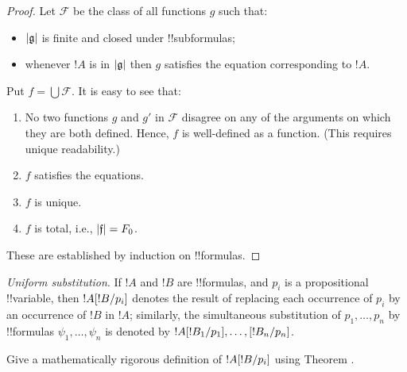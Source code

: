 \documentclass[../../include/open-logic-section]{subfiles}
\begin{document}
\begin{proof}
  Let $\mathcal{F}$ be the class of all functions $g$ such that:
  \begin{itemize}
  \item $\left| \mathfrak g \right|$ is finite and closed under !!{subformula}s;
  \item whenever $!A$ is in $\left| \mathfrak g \right|$ then $g$ satisfies the
    equation corresponding to $!A$.
  \end{itemize}
  Put $f = \bigcup \mathcal{F}$. It is easy to see that: 
  \begin{enumerate}
  \item No two functions $g$ and $g'$ in $\mathcal{F}$ disagree on any
    of the arguments on which they are both defined. Hence, $f$ is
    well-defined as a function. (This requires unique readability.)
  \item $f$ satisfies the equations.
  \item $f$ is unique.
  \item $f$ is total, i.e., $\left| \mathfrak f \right| = F_0$.
  \end{enumerate}
These are established by induction on !!{formula}s.
\end{proof}

\begin{defn} 
  \emph{Uniform substitution}.  If $!A$ and $!B$ are !!{formula}s,
  and $p_i$ is a propositional !!{variable}, then
  $!A[!B/p_i]$ denotes the result of replacing each
  occurrence of $p_i$ by an occurrence of $!B$ in $!A$;
  similarly, the simultaneous substitution of $p_1,\ldots,p_n$ by
  !!{formula}s $\psi_1,\ldots,\psi_n$ is denoted by
  $!A[!B_1/p_1],\ldots ,[!B_n/p_n]$.
\end{defn}

\begin{prob}
  Give a mathematically rigorous definition of
  $!A[!B/p_i]$ using Theorem .
\end{prob}
\end{document}
